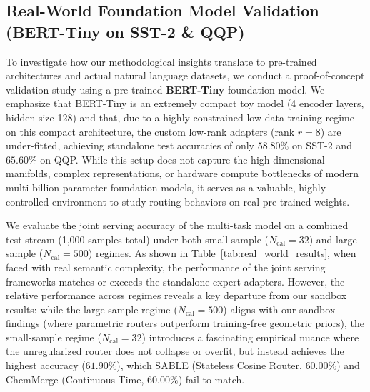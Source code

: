 \subsection{Real-World Foundation Model Validation (BERT-Tiny on SST-2 \& QQP)}
\label{subsec:real_world_validation}

To investigate how our methodological insights translate to pre-trained architectures and actual natural language datasets, we conduct a proof-of-concept validation study using a pre-trained \textbf{BERT-Tiny} foundation model. We emphasize that BERT-Tiny is an extremely compact toy model (4 encoder layers, hidden size 128) and that, due to a highly constrained low-data training regime on this compact architecture, the custom low-rank adapters (rank $r=8$) are under-fitted, achieving standalone test accuracies of only $58.80\%$ on SST-2 and $65.60\%$ on QQP. While this setup does not capture the high-dimensional manifolds, complex representations, or hardware compute bottlenecks of modern multi-billion parameter foundation models, it serves as a valuable, highly controlled environment to study routing behaviors on real pre-trained weights.

We evaluate the joint serving accuracy of the multi-task model on a combined test stream (1,000 samples total) under both small-sample ($N_{\text{cal}}=32$) and large-sample ($N_{\text{cal}}=500$) regimes. As shown in Table~\ref{tab:real_world_results}, when faced with real semantic complexity, the performance of the joint serving frameworks matches or exceeds the standalone expert adapters. However, the relative performance across regimes reveals a key departure from our sandbox results: while the large-sample regime ($N_{\text{cal}}=500$) aligns with our sandbox findings (where parametric routers outperform training-free geometric priors), the small-sample regime ($N_{\text{cal}}=32$) introduces a fascinating empirical nuance where the unregularized router does not collapse or overfit, but instead achieves the highest accuracy ($61.90\%$), which SABLE (Stateless Cosine Router, $60.00\%$) and ChemMerge (Continuous-Time, $60.00\%$) fail to match.

